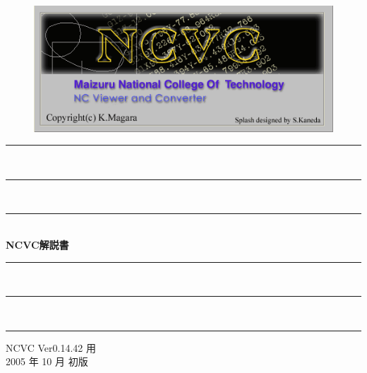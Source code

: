 
\vspace*{4zh}
\begin{figure}[H]
\centering
\includegraphics[scale=1.2]{logo.png}
\end{figure}

\vspace*{3zh}
\begin{center}
    \rule{6cm}{0.2zw}\\[-0.5zh]
    \rule{5cm}{0.1zw}\\[-0.5zh]
    \rule{4cm}{0.05zw}\\[1zh]
    {\Large \textbf{NCVC解説書}}\\
    \rule{4cm}{0.05zw}\\[-0.5zh]
    \rule{5cm}{0.1zw}\\[-0.5zh]
    \rule{6cm}{0.2zw}

    \vspace*{8cm}
    NCVC Ver0.14.42 用\\
    2005 年 10 月 初版
\end{center}
